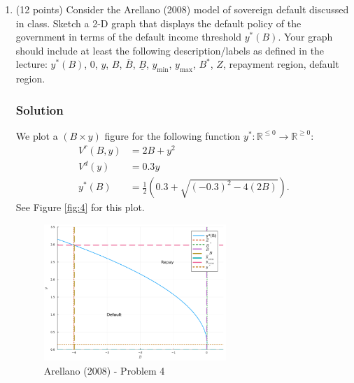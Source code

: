 \documentclass[12pt]{article}
\begin{document}
\begin{enumerate}
\begin{enumerate}[label=(\alph*)]
    \end{enumerate}

    \item (12 points) Consider the Arellano (2008) model of sovereign default discussed in class. Sketch a 2-D graph that displays the default policy of the government in terms of the default income threshold $y^*(B)$. Your graph should include at least the following description/labels as defined in the lecture: $y^*(B)$, 0, $y$, $B$, $\bar{B}$, $\underline{B}$, $y_{\min}$, $y_{\max}$, $B^*$, $Z$, repayment region, default region.
    \subsubsection*{Solution}

    We plot a $(B \times y)$ figure for the following function $y^*: \mathbb{R}^{\leq 0} \to \mathbb{R}^{\geq 0}$:
\begin{align*}
  V^r(B,y) &= 2B + y^2 
  \\ V^d(y) &= 0.3y
  \\ y^*(B) &= \frac{1}{2}\left(0.3+\sqrt{(-0.3)^{2}-4\left(2B\right)}\right).
\end{align*}
    See Figure \eqref{fig:4} for this plot.
    \begin{figure}[h]
            \centering
                \includegraphics[width=0.65\textwidth]{pset2/q4.png}
                \caption{Arellano (2008) - Problem 4}
                \label{fig:4}
        \end{figure}


\end{enumerate}
\end{document}
